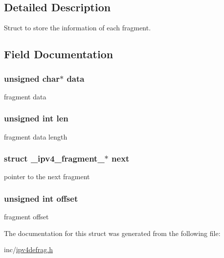 \subsection{Detailed Description}
Struct to store the information of each fragment. 

\subsection{Field Documentation}
\hypertarget{struct__ipv4__fragment___ac24cea2bfcc927fd29bc74d1086707d8}{
\subsubsection[{data}]{\setlength{\rightskip}{0pt plus 5cm}unsigned char$\ast$ data}}\label{struct__ipv4__fragment___ac24cea2bfcc927fd29bc74d1086707d8}


fragment data 

\hypertarget{struct__ipv4__fragment___a77124bd5f7e31e6fffc19f335da0c23f}{
\subsubsection[{len}]{\setlength{\rightskip}{0pt plus 5cm}unsigned int len}}\label{struct__ipv4__fragment___a77124bd5f7e31e6fffc19f335da0c23f}


fragment data length 

\hypertarget{struct__ipv4__fragment___a909d1ac6593a89af1237e515062678a9}{
\subsubsection[{next}]{\setlength{\rightskip}{0pt plus 5cm}struct {\bf \-\_\-ipv4\-\_\-fragment\-\_\-}$\ast$ next}}\label{struct__ipv4__fragment___a909d1ac6593a89af1237e515062678a9}


pointer to the next fragment 

\hypertarget{struct__ipv4__fragment___a29b5297d3393519050e3126c4cb07c1c}{
\subsubsection[{offset}]{\setlength{\rightskip}{0pt plus 5cm}unsigned int offset}}\label{struct__ipv4__fragment___a29b5297d3393519050e3126c4cb07c1c}


fragment offset 



The documentation for this struct was generated from the following file\-:\begin{DoxyCompactItemize}
\item 
inc/\hyperlink{ipv4defrag_8h}{ipv4defrag.\-h}\end{DoxyCompactItemize}
